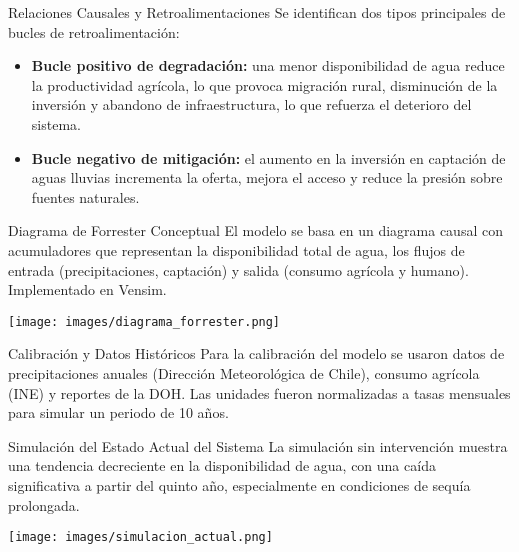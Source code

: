 \documentclass[aspectratio=169]{beamer}
\begin{document}
\begin{frame}{Relaciones Causales y Retroalimentaciones}
Se identifican dos tipos principales de bucles de retroalimentación:
\begin{itemize}
    \item \textbf{Bucle positivo de degradación:} una menor disponibilidad de agua reduce la productividad agrícola, lo que provoca migración rural, disminución de la inversión y abandono de infraestructura, lo que refuerza el deterioro del sistema.
    \item \textbf{Bucle negativo de mitigación:} el aumento en la inversión en captación de aguas lluvias incrementa la oferta, mejora el acceso y reduce la presión sobre fuentes naturales.
\end{itemize}
\end{frame}

\begin{frame}{Diagrama de Forrester Conceptual}
El modelo se basa en un diagrama causal con acumuladores que representan la disponibilidad total de agua, los flujos de entrada (precipitaciones, captación) y salida (consumo agrícola y humano). Implementado en Vensim.

\begin{center}
\texttt{[image: images/diagrama\_forrester.png]}
\end{center}
\end{frame}

\begin{frame}{Calibración y Datos Históricos}
Para la calibración del modelo se usaron datos de precipitaciones anuales (Dirección Meteorológica de Chile), consumo agrícola (INE) y reportes de la DOH. Las unidades fueron normalizadas a tasas mensuales para simular un periodo de 10 años.
\end{frame}

\begin{frame}{Simulación del Estado Actual del Sistema}
La simulación sin intervención muestra una tendencia decreciente en la disponibilidad de agua, con una caída significativa a partir del quinto año, especialmente en condiciones de sequía prolongada.

\begin{center}
\texttt{[image: images/simulacion\_actual.png]}
\end{center}
\end{frame}
\end{document}
